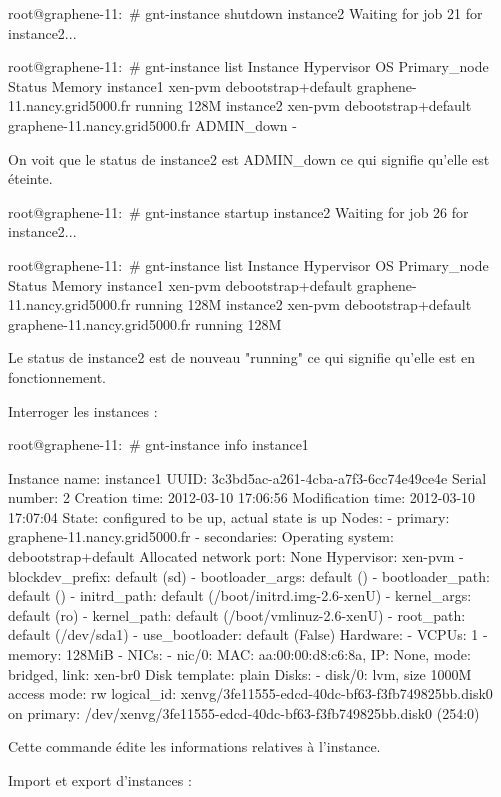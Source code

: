 root@graphene-11:~# gnt-instance shutdown instance2
Waiting for job 21 for instance2...

root@graphene-11:~# gnt-instance list
Instance  Hypervisor OS                  Primary_node                  Status     Memory
instance1 xen-pvm    debootstrap+default graphene-11.nancy.grid5000.fr running      128M
instance2 xen-pvm    debootstrap+default graphene-11.nancy.grid5000.fr ADMIN_down      -

On voit que le status de instance2 est ADMIN_down ce qui signifie qu'elle est éteinte.

root@graphene-11:~# gnt-instance startup instance2
Waiting for job 26 for instance2...

root@graphene-11:~# gnt-instance list
Instance  Hypervisor OS                  Primary_node                  Status  Memory
instance1 xen-pvm    debootstrap+default graphene-11.nancy.grid5000.fr running   128M
instance2 xen-pvm    debootstrap+default graphene-11.nancy.grid5000.fr running   128M

Le status de instance2 est de nouveau "running" ce qui signifie qu'elle est en fonctionnement.

Interroger les instances :

root@graphene-11:~# gnt-instance info instance1

Instance name: instance1
UUID: 3c3bd5ac-a261-4cba-a7f3-6cc74e49ce4e
Serial number: 2
Creation time: 2012-03-10 17:06:56
Modification time: 2012-03-10 17:07:04
State: configured to be up, actual state is up
  Nodes:
    - primary: graphene-11.nancy.grid5000.fr
    - secondaries: 
  Operating system: debootstrap+default
  Allocated network port: None
  Hypervisor: xen-pvm
    - blockdev_prefix: default (sd)
    - bootloader_args: default ()
    - bootloader_path: default ()
    - initrd_path: default (/boot/initrd.img-2.6-xenU)
    - kernel_args: default (ro)
    - kernel_path: default (/boot/vmlinuz-2.6-xenU)
    - root_path: default (/dev/sda1)
    - use_bootloader: default (False)
  Hardware:
    - VCPUs: 1
    - memory: 128MiB
    - NICs:
      - nic/0: MAC: aa:00:00:d8:c6:8a, IP: None, mode: bridged, link: xen-br0
  Disk template: plain
  Disks:
    - disk/0: lvm, size 1000M
      access mode: rw
      logical_id:  xenvg/3fe11555-edcd-40dc-bf63-f3fb749825bb.disk0
      on primary:  /dev/xenvg/3fe11555-edcd-40dc-bf63-f3fb749825bb.disk0 (254:0)

Cette commande édite les informations relatives à l'instance.


Import et export d'instances :


